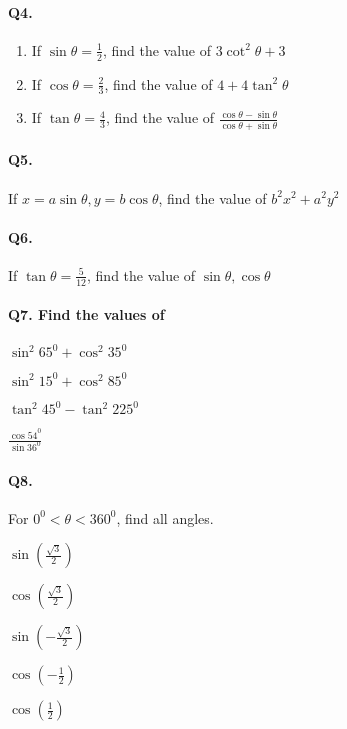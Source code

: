 \documentclass{article}
\begin{document}
\paragraph{Q4.}
\begin{enumerate}[label=\alph*)]
  \item If $\sin\theta = \frac{1}{2}$, find the value of $3\cot^{2}\theta+3$
  \item If $\cos\theta = \frac{2}{3}$, find the value of $4+4\tan^{2}\theta$
  \item If $\tan\theta = \frac{4}{3}$, find the value of $\frac{\cos\theta - \sin\theta}{\cos\theta + \sin\theta}$
\end{enumerate}

\paragraph{Q5.}
If $x = a\sin\theta, y = b\cos\theta$, find the value of $b^{2}x^{2}+a^{2}y^{2}$

\paragraph{Q6.}
If $\tan\theta = \frac{5}{12}$, find the value of $\sin\theta, \cos\theta$

\paragraph{Q7. Find the values of}
\begin{enumerate*}[label=\alph*)]
          \item $\sin^{2}65^{0} + \cos^{2}35^{0}$
          \item $\sin^{2}15^{0} + \cos^{2}85^{0}$
          \item $\tan^{2}45^{0} - \tan^{2}225^{0}$
          \item $\frac{\cos54^{0}}{\sin36^{0}}$
\end{enumerate*}

\paragraph{Q8.}
For $0^{0}<\theta<360^{0}$, find all angles.

\begin{enumerate*}[label=\alph*.]
          \item $\sin(\frac{\sqrt{3}}{2})$
          \item $\cos(\frac{\sqrt{3}}{2})$
          \item $\sin(-\frac{\sqrt{3}}{2})$
          \item $\cos(-\frac{1}{2})$
          \item $\cos(\frac{1}{2})$
\end{enumerate*}
\end{document}
